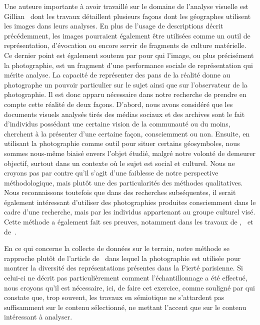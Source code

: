 Une auteure importante à avoir travaillé sur le domaine de l'analyse visuelle est Gillian~\citet{Rose2008} dont les travaux détaillent plusieurs façons dont les géographes utilisent les images dans leurs analyses.
En plus de l'usage de descriptions décrit précédemment, les images pourraient également être utilisées comme un outil de représentation, d'évocation ou encore servir de fragments de culture matérielle.
Ce dernier point est également soutenu par \citet{Frosh2001} pour qui l'image, ou plus précisément la photographie, est un fragment d'une performance sociale de représentation qui mérite analyse.
La capacité de représenter des pans de la réalité donne au photographe un pouvoir particulier sur le sujet ainsi que sur l'observateur de la photographie.
Il est donc apparu nécessaire dans notre recherche de prendre en compte cette réalité de deux façons. 
D'abord, nous avons considéré que les documents visuels analysés tirés des médias sociaux et des archives sont le fait d'individus possédant une certaine vision de la communauté \lgbt{} ou du moins, cherchent à la présenter d'une certaine façon, consciemment ou non.
Ensuite, en utilisant la photographie comme outil pour situer certains géosymboles, nous sommes nous-même biaisé envers l'objet étudié, malgré notre volonté de demeurer objectif, surtout dans un contexte où le sujet est social et culturel.
Nous ne croyons pas par contre qu'il s'agit d'une faiblesse de notre perspective méthodologique, mais plutôt une des particularités des méthodes qualitatives.
Nous reconnaissons toutefois que dans des recherches subséquentes, il serait également intéressant d'utiliser des photographies produites consciemment dans le cadre d'une recherche, mais par les individus appartenant au groupe culturel visé.
Cette méthode a également fait ses preuves, notamment dans les travaux de \citet{Kwan2008},~\citet{Moore2008} et de~\citet{Markwell2000}.

En ce qui concerne la collecte de données sur le terrain, notre méthode se rapproche plutôt de l'article de~\citet{Leroy2010} dans lequel la photographie est utilisée pour montrer la diversité des représentations présentes dans la Fierté parisienne.
Si celui-ci ne décrit pas particulièrement comment l'échantillonnage a été effectué, nous croyons qu'il est nécessaire, ici, de faire cet exercice, comme souligné par \citet[109]{Rose2012} qui constate que, trop souvent, les travaux en sémiotique ne s'attardent pas suffisamment sur le contenu sélectionné, ne mettant l'accent que sur le contenu intéressant à analyser.

